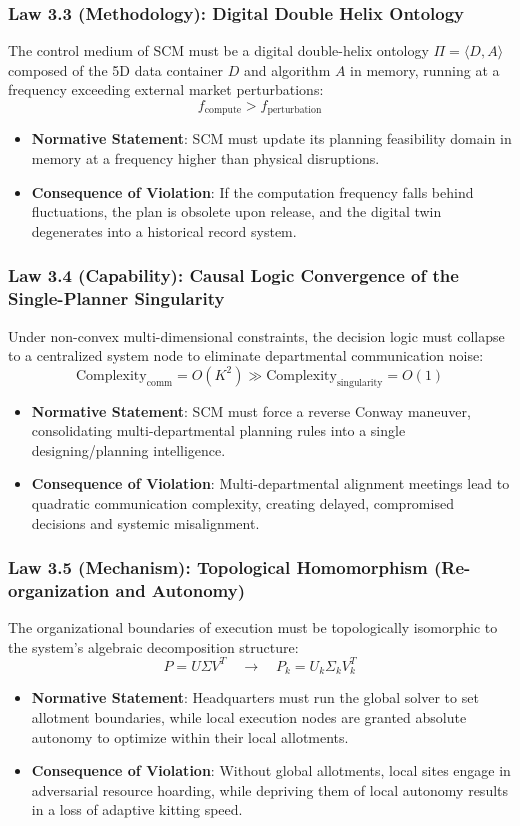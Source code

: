 \documentclass[11pt,a4paper]{article}
\begin{document}
\subsubsection{Law 3.3 (Methodology): Digital Double Helix Ontology}
The control medium of SCM must be a digital double-helix ontology $\Pi = \langle D, A \rangle$ composed of the 5D data container $D$ and algorithm $A$ in memory, running at a frequency exceeding external market perturbations:
$$f_{\text{compute}} > f_{\text{perturbation}}$$
\begin{itemize}
    \item \textbf{Normative Statement}: SCM must update its planning feasibility domain in memory at a frequency higher than physical disruptions.
    \item \textbf{Consequence of Violation}: If the computation frequency falls behind fluctuations, the plan is obsolete upon release, and the digital twin degenerates into a historical record system.
\end{itemize}

\subsubsection{Law 3.4 (Capability): Causal Logic Convergence of the Single-Planner Singularity}
Under non-convex multi-dimensional constraints, the decision logic must collapse to a centralized system node to eliminate departmental communication noise:
$$\text{Complexity}_{\text{comm}} = O(K^2) \gg \text{Complexity}_{\text{singularity}} = O(1)$$
\begin{itemize}
    \item \textbf{Normative Statement}: SCM must force a reverse Conway maneuver, consolidating multi-departmental planning rules into a single designing/planning intelligence.
    \item \textbf{Consequence of Violation}: Multi-departmental alignment meetings lead to quadratic communication complexity, creating delayed, compromised decisions and systemic misalignment.
\end{itemize}

\subsubsection{Law 3.5 (Mechanism): Topological Homomorphism (Re-organization and Autonomy)}
The organizational boundaries of execution must be topologically isomorphic to the system's algebraic decomposition structure:
$$P = U \Sigma V^T \quad \to \quad P_k = U_k \Sigma_k V_k^T$$
\begin{itemize}
    \item \textbf{Normative Statement}: Headquarters must run the global solver to set allotment boundaries, while local execution nodes are granted absolute autonomy to optimize within their local allotments.
    \item \textbf{Consequence of Violation}: Without global allotments, local sites engage in adversarial resource hoarding, while depriving them of local autonomy results in a loss of adaptive kitting speed.
\end{itemize}
\end{document}
